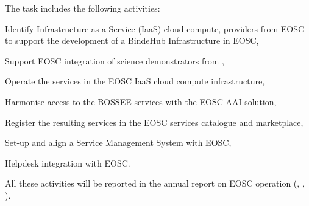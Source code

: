 \begin{task}[
  title=Collaboration with EOSC,
  id=eosc,
  lead=EGI,
  PM=24,
  wphases={12-48},
  partners={SRL,XFEL,WTT}
]
  The task includes the following activities:
  \begin{compactitem}
  \item Identify Infrastructure as a Service (IaaS) cloud compute,
    providers from EOSC to support the development of a BindeHub
    Infrastructure in EOSC,
  \item Support EOSC integration of science demonstrators from ,
  \item Operate the services in the EOSC IaaS cloud compute infrastructure,
  \item Harmonise access to the BOSSEE services with the EOSC AAI solution,
  \item Register the resulting services in the EOSC services catalogue and marketplace,
  \item Set-up and align a Service Management System with EOSC,
  \item Helpdesk integration with EOSC.
  \end{compactitem}

   All these activities will be reported in the annual report on EOSC operation (, , ).
\end{task}
